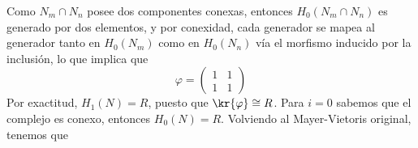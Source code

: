 \documentclass{article}
\begin{document}
\begin{enumerate}
    \vspace{2mm}
    \centerline{
    }
    \vspace{1mm}
    Como $N_{m}\cap N_{n}$ posee dos componentes conexas, entonces $H_{0}(N_{m}\cap N_{n})$ es 
    generado por dos elementos, y por conexidad, cada generador se mapea al generador tanto en 
    $H_{0}(N_{m})$ como en $H_{0}(N_{n})$ vía el morfismo inducido por la inclusión, lo que 
    implica que
    \begin{equation*}
        \varphi=\begin{pmatrix}
            1 & 1 \\ 1 & 1
        \end{pmatrix}
    \end{equation*}
    Por exactitud, $H_{1}(N)=R$, puesto que $\kr{\varphi}\cong R$. Para $i=0$ sabemos que el 
    complejo es conexo, entonces $H_{0}(N)= R$. Volviendo al Mayer-Vietoris original, tenemos que


\end{enumerate}
\end{document}
